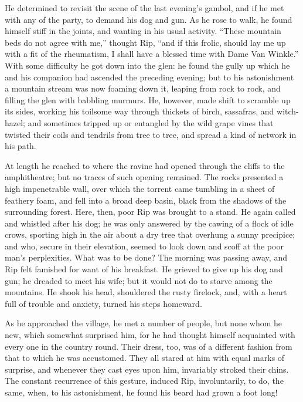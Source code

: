 He determined to revisit the scene of the last evening’s gambol, and if he met with any of the party, to demand his dog and gun. As he rose to walk, he found himself stiff in the joints, and wanting in his usual activity. “These mountain beds do not agree with me,” thought Rip, “and if this frolic, should lay me up with a fit of the rheumatism, I shall have a blessed time with Dame Van Winkle.” With some difficulty he got down into the glen: he found the gully up which he and his companion had ascended the preceding evening; but to his astonishment a mountain stream was now foaming down it, leaping from rock to rock, and filling the glen with babbling murmurs. He, however, made shift to scramble up its sides, working his toilsome way through thickets of birch, sassafras, and witch-hazel; and sometimes tripped up or entangled by the wild grape vines that twisted their coils and tendrils from tree to tree, and spread a kind of network in his path.

At length he reached to where the ravine had opened through the cliffs to the amphitheatre; but no traces of such opening remained. The rocks presented a high impenetrable wall, over which the torrent came tumbling in a sheet of feathery foam, and fell into a broad deep basin, black from the shadows of the surrounding forest. Here, then, poor Rip was brought to a stand. He again called and whistled after his dog; he was only answered by the cawing of a flock of idle crows, sporting high in the air about a dry tree that overhung a sunny precipice; and who, secure in their elevation, seemed to look down and scoff at the poor man’s perplexities. What was to be done? The morning was passing away, and Rip felt famished for want of his breakfast. He grieved to give up his dog and gun; he dreaded to meet his wife; but it would not do to starve among the mountains. He shook his head, shouldered the rusty firelock, and, with a heart full of trouble and anxiety, turned his steps homeward.

As he approached the village, he met a number of people, but none whom he new, which somewhat surprised him, for he had thought himself acquainted with every one in the country round. Their dress, too, was of a different fashion from that to which he was accustomed. They all stared at him with equal marks of surprise, and whenever they cast eyes upon him, invariably stroked their chins. The constant recurrence of this gesture, induced Rip, involuntarily, to do, the same, when, to his astonishment, he found his beard had grown a foot long!

